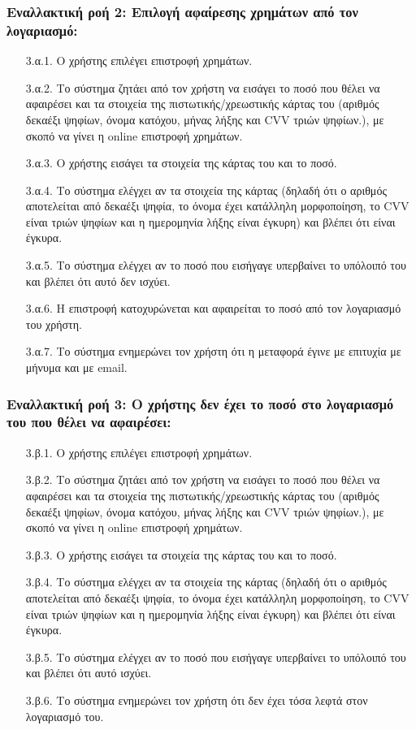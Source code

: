 \documentclass[12pt,a4paper]{article}
\begin{document}
\subsubsection*{Εναλλακτική ροή 2: Επιλογή αφαίρεσης χρημάτων από τον λογαριασμό:}
\begin{enumerate}
    \item [3.α.1.] Ο χρήστης επιλέγει επιστροφή χρημάτων.
    \item [3.α.2.] Το σύστημα ζητάει από τον χρήστη να εισάγει το ποσό που θέλει να αφαιρέσει και τα στοιχεία της πιστωτικής/χρεωστικής κάρτας του (αριθμός δεκαέξι ψηφίων, όνομα κατόχου, μήνας λήξης και CVV τριών ψηφίων.), με σκοπό να γίνει η online επιστροφή χρημάτων.
    \item [3.α.3.] Ο χρήστης εισάγει τα στοιχεία της κάρτας του και το ποσό.
    \item [3.α.4.] Το σύστημα ελέγχει αν τα στοιχεία της κάρτας (δηλαδή ότι ο αριθμός αποτελείται από δεκαέξι ψηφία, το όνομα έχει κατάλληλη μορφοποίηση, το CVV είναι τριών ψηφίων και η ημερομηνία λήξης είναι έγκυρη) και βλέπει ότι είναι έγκυρα.
    \item [3.α.5.] Το σύστημα ελέγχει αν το ποσό που εισήγαγε υπερβαίνει το υπόλοιπό του και βλέπει ότι αυτό δεν ισχύει. 
    \item [3.α.6.] Η επιστροφή κατοχυρώνεται και αφαιρείται το ποσό από τον λογαριασμό του χρήστη.
    \item [3.α.7.] Το σύστημα ενημερώνει τον χρήστη ότι η μεταφορά έγινε με επιτυχία με μήνυμα και με email.
\end{enumerate}

\subsubsection*{Εναλλακτική ροή 3: Ο χρήστης δεν έχει το ποσό στο λογαριασμό του που θέλει να αφαιρέσει:}
\begin{enumerate}
    \item [3.β.1.] Ο χρήστης επιλέγει επιστροφή χρημάτων.
    \item [3.β.2.] Το σύστημα ζητάει από τον χρήστη να εισάγει το ποσό που θέλει να αφαιρέσει και τα στοιχεία της πιστωτικής/χρεωστικής κάρτας του (αριθμός δεκαέξι ψηφίων, όνομα κατόχου, μήνας λήξης και CVV τριών ψηφίων.), με σκοπό να γίνει η online επιστροφή χρημάτων.
    \item [3.β.3.] Ο χρήστης εισάγει τα στοιχεία της κάρτας του και το ποσό.
    \item [3.β.4.] Το σύστημα ελέγχει αν τα στοιχεία της κάρτας (δηλαδή ότι ο αριθμός αποτελείται από δεκαέξι ψηφία, το όνομα έχει κατάλληλη μορφοποίηση, το CVV είναι τριών ψηφίων και η ημερομηνία λήξης είναι έγκυρη) και βλέπει ότι είναι έγκυρα.
    \item [3.β.5.] Το σύστημα ελέγχει αν το ποσό που εισήγαγε υπερβαίνει το υπόλοιπό του και βλέπει ότι αυτό ισχύει. 
    \item [3.β.6.] Το σύστημα ενημερώνει τον χρήστη ότι δεν έχει τόσα λεφτά στον λογαριασμό του.
\end{enumerate}
\end{document}
